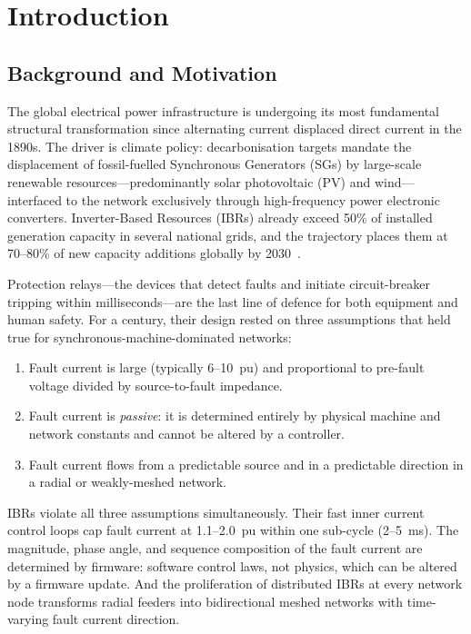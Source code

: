 \chapter{Introduction}
\label{ch:introduction}

\section{Background and Motivation}
\label{sec:ch1_background}

The global electrical power infrastructure is undergoing its most fundamental
structural transformation since alternating current displaced direct current
in the 1890s. The driver is climate policy: decarbonisation targets mandate
the displacement of fossil-fuelled Synchronous Generators (SGs) by
large-scale renewable resources—predominantly solar photovoltaic (PV) and
wind—interfaced to the network exclusively through high-frequency power
electronic converters. Inverter-Based Resources (IBRs) already exceed
50\% of installed generation capacity in several national grids, and the
trajectory places them at 70--80\% of new capacity additions globally
by 2030~\citep{IRENA2023}.

Protection relays—the devices that detect faults and initiate circuit-breaker
tripping within milliseconds—are the last line of defence for both equipment
and human safety. For a century, their design rested on three assumptions
that held true for synchronous-machine-dominated networks:
\begin{enumerate}
\item Fault current is large (typically 6--10~pu) and proportional to
      pre-fault voltage divided by source-to-fault impedance.
\item Fault current is \emph{passive}: it is determined entirely by physical
      machine and network constants and cannot be altered by a controller.
\item Fault current flows from a predictable source and in a predictable
      direction in a radial or weakly-meshed network.
\end{enumerate}
IBRs violate all three assumptions simultaneously. Their fast inner current
control loops cap fault current at 1.1--2.0~pu within one sub-cycle (2--5~ms).
The magnitude, phase angle, and sequence composition of the fault current
are determined by firmware: software control laws, not physics, which can
be altered by a firmware update. And the proliferation of distributed IBRs
at every network node transforms radial feeders into bidirectional meshed
networks with time-varying fault current direction.

